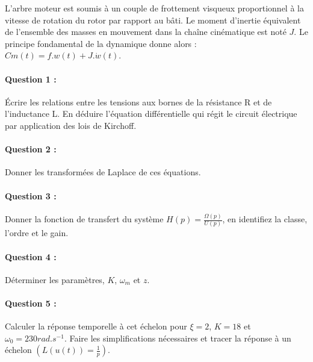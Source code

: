 L'arbre moteur est soumis à un couple de frottement visqueux proportionnel à la vitesse de rotation du rotor par rapport au bâti. Le moment d'inertie équivalent de l'ensemble des masses en mouvement dans la chaîne cinématique est noté $J$. Le principe fondamental de la dynamique donne alors : $Cm(t)=f.w(t)+J.\dot{w}(t)$.

 
\paragraph{Question 1 :} Écrire les relations entre les tensions aux bornes de la résistance R et de l'inductance L. En déduire l'équation différentielle qui régit le circuit électrique par application des lois de Kirchoff.

\paragraph{Question 2 :} Donner les transformées de Laplace de ces équations. 

\paragraph{Question 3 :} Donner la fonction de transfert du système $H(p)=\frac{\Omega(p)}{U(p)}$, en identifiez la classe, l'ordre et le gain.

\paragraph{Question 4 :} Déterminer les paramètres, $K$, $\omega_m$ et $z$.

\paragraph{Question 5 :} Calculer la réponse temporelle à cet échelon pour $\xi=2$, $K=18$ et $\omega_0=230rad.s^{-1}$. Faire les simplifications nécessaires et tracer la réponse à un échelon $(L(u(t))=\frac{1}{p})$. 

